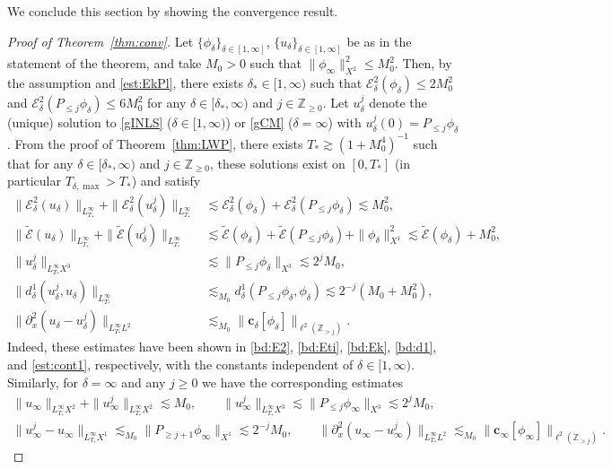 \documentclass{amsart}
\numberwithin{equation}{section}
\newcommand{\Z}{\mathbb{Z}}
\begin{document}
We conclude this section by showing the convergence result.
\begin{proof}[Proof of Theorem~\ref{thm:conv}]
Let $\{ \phi_\delta\}_{\delta\in [1,\infty]}$, $\{ u_\delta\}_{\delta\in[1,\infty]}$ be as in the statement of the theorem, and take $M_0>0$ such that $\| \phi_\infty\|_{X^2}^2\leq M_0^2$. 
Then, by the assumption and \eqref{est:EkPl}, there exists $\delta_*\in [1,\infty)$ such that $\mathcal{E}^2_\delta(\phi_\delta)\leq 2M_0^2$ and $\mathcal{E}^2_\delta(P_{\leq j}\phi_\delta)\leq 6M_0^2$ for any $\delta\in [\delta_*,\infty )$ and $j\in \Z_{\geq 0}$.
Let $u_\delta^j$ denote the (unique) solution to \eqref{gINLS} ($\delta\in [1,\infty)$) or \eqref{gCM} ($\delta=\infty$) with $u_\delta^j(0)=P_{\leq j}\phi_\delta$. 
From the proof of Theorem~\ref{thm:LWP}, there exists $T_*\gtrsim (1+M_0^4)^{-1}$ such that  for any $\delta\in [\delta_*,\infty )$ and $j\in \Z_{\geq 0}$, these solutions exist on $[0,T_*]$ (in particular $T_{\delta,\max}>T_*$) and satisfy
\begin{align}
\| \mathcal{E}^2_\delta(u_\delta)\|_{L^\infty_{T_*}}+\| \mathcal{E}^2_\delta(u_\delta^j)\|_{L^\infty_{T_*}}&\lesssim \mathcal{E}^2_\delta(\phi_\delta)+\mathcal{E}^2_\delta(P_{\leq j}\phi_\delta)\lesssim M_0^2, \label{est:apriori-delta1} \\
\| \widetilde{\mathcal{E}}(u_\delta)\|_{L^\infty_{T_*}}+\| \widetilde{\mathcal{E}}(u_\delta^j)\|_{L^\infty_{T_*}}&\lesssim \widetilde{\mathcal{E}}(\phi_\delta)+\widetilde{\mathcal{E}}(P_{\leq j}\phi_\delta)+\| \phi_\delta\|_{X^1}^2\lesssim \widetilde{\mathcal{E}}(\phi_\delta)+M_0^2, \label{est:apriori-delta1'} \\
\| u_\delta^j \|_{L^\infty_{T_*}X^3}&\lesssim \| P_{\leq j}\phi_\delta\|_{X^3}\lesssim 2^jM_0, \label{est:apriori-delta2} \\
\| d^1_\delta(u_\delta^j,u_\delta)\|_{L^\infty_{T_*}}&\lesssim_{M_0} d^1_\delta(P_{\leq j}\phi_\delta,\phi_\delta)\lesssim 2^{-j}(M_0+M_0^2), \label{est:apriori-delta3} \\
\| \partial_x^2(u_\delta-u_\delta^j)\|_{L^\infty_{T_*}L^2}&\lesssim _{M_0}\| \mathbf{c}_{\delta}[\phi_\delta]\|_{\ell^2(\Z_{>j})}. \label{est:apriori-delta4}
\end{align}
Indeed, these estimates have been shown in \eqref{bd:E2}, \eqref{bd:Eti}, \eqref{bd:Ek}, \eqref{bd:d1}, and \eqref{est:cont1}, respectively, with the constants independent of $\delta\in [1,\infty )$. 
Similarly, for $\delta=\infty$ and any $j\geq 0$ we have the corresponding estimates 
\begin{gather*}
\| u_\infty\|_{L^\infty_{T_*}X^2}+\| u_\infty^j\|_{L^\infty_{T_*}X^2}\lesssim M_0,\qquad \| u_\infty^j\|_{L^\infty_{T_*}X^3}\lesssim \| P_{\leq j}\phi_\infty\|_{X^3}\lesssim 2^jM_0, \\
\| u_\infty^j-u_\infty\|_{L^\infty_{T_*}X^1}\lesssim _{M_0}\| P_{\geq j+1}\phi_\infty\|_{X^1}\lesssim 2^{-j}M_0,\qquad \| \partial_x^2(u_\infty-u_\infty^j)\|_{L^\infty_{T_*}L^2}\lesssim _{M_0}\| \mathbf{c}_\infty[\phi_\infty]\|_{\ell^2(\Z_{>j})}.
\end{gather*}


\end{proof}
\end{document}
